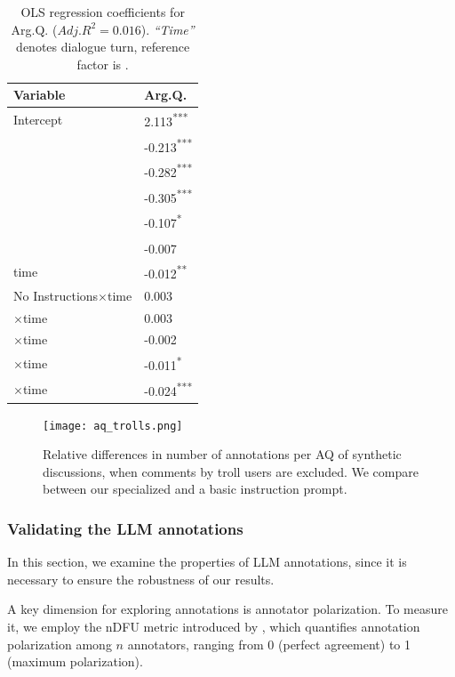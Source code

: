 \begin{table}
	\centering
	\begin{tabular}{l p{2.5cm}}
		\toprule
		\textbf{Variable} & \textbf{Arg.Q.} \\
		\midrule
		Intercept & 2.113\textsuperscript{***} \\
		\strategynoinstr & -0.213\textsuperscript{***} \\
		\strategymodgame & -0.282\textsuperscript{***} \\
		\strategyrules & -0.305\textsuperscript{***} \\
		\strategyregroom & -0.107\textsuperscript{*} \\
		\strategyconstrcomm & -0.007\textsuperscript{} \\
		time & -0.012\textsuperscript{**} \\
		No Instructions$\times$time & 0.003 \\
		\strategymodgame$\times$time & 0.003 \\
		\strategyrules$\times$time & -0.002 \\
		\strategyregroom$\times$time & -0.011\textsuperscript{*} \\
		\strategyconstrcomm$\times$time & -0.024\textsuperscript{***} \\
		\bottomrule
	\end{tabular}
	\small
	\asterisknote
	\normalsize
	\caption{\ac{OLS} regression coefficients for Arg.Q. ($Adj.R^2=0.016$). \textit{“Time”} denotes dialogue turn, reference factor is \emph{\strategynomod}.}
	\label{tab:argq}
\end{table}


\begin{figure}
	\centering
	\texttt{[image: aq\_trolls.png]}
	\caption{Relative differences in number of annotations per \ac{AQ} of synthetic discussions, when comments by troll users are excluded. We compare between our specialized and a basic instruction prompt.}
	\label{fig:aq_trolls}
\end{figure}


\subsubsection{Validating the LLM annotations}

In this section, we examine the properties of \ac{LLM} annotations, since it is necessary to ensure the robustness of our results.

A key dimension for exploring annotations is annotator polarization. To measure it, we employ the \ac{nDFU} metric introduced by \citet{pavlopoulos-likas-2024-polarized}, which quantifies annotation polarization among $n$ annotators, ranging from 0 (perfect agreement) to 1 (maximum polarization). %

